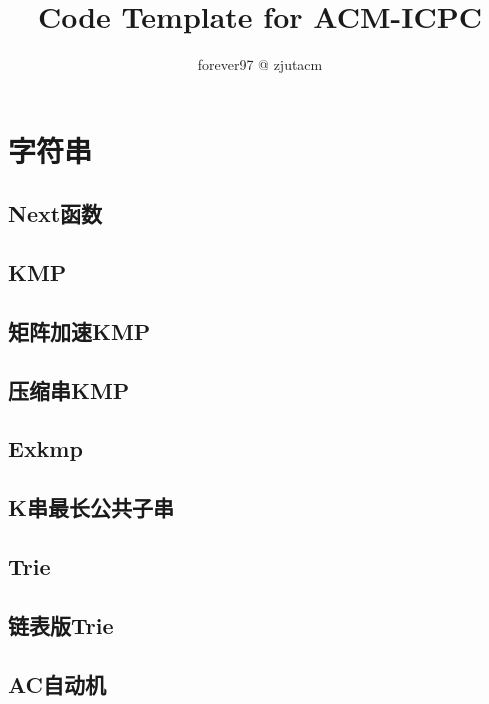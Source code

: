 \documentclass{article}
\title{Code Template for ACM-ICPC}
\author{forever97 @ zjutacm}
\begin{document}
\begin{titlepage}
\maketitle
\thispagestyle{empty}
\pagebreak
\pagestyle{plain}
\tableofcontents
\end{titlepage}
\newpage %
\section{字符串} %
\subsection{Next函数} %
\subsection{KMP} 
 
\subsection{矩阵加速KMP} 
 
\subsection{压缩串KMP} 
 
\subsection{Exkmp} 
 
\subsection{K串最长公共子串} 
 

\subsection{Trie} 
 
\subsection{链表版Trie} 
 

\subsection{AC自动机} 
 
\end{document}
